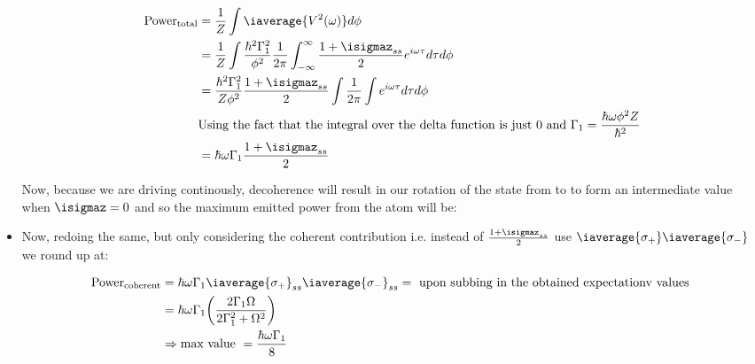 \begin{itemize}
 	\begin{equation}\label{feb220183}
 \begin{aligned}
 		\text{Power}_\text{total} &= \frac{1}{Z}\int 	\iaverage{V^2(\omega)}  d\phi\\
 		& = \frac{1}{Z}\int \frac{\hbar^2\Gamma_1^{2}}{\phi^2}\frac{1}{2\pi}\int_{-\infty}^{\infty} \frac{1+{\isigmaz}_{ss}}{2} e^{i\omega \tau}d\tau   d\phi\\
 		& = \frac{\hbar^2\Gamma_1^2}{Z\phi^2} \frac{1+{\isigmaz}_{ss}}{2} \int\frac{1}{2\pi}\int e^{i\omega\tau}d\tau d\phi\\
 		& \text{Using the fact that the integral over the delta function is just 0 and } \Gamma_1 = \frac{\hbar\omega\phi^2Z}{\hbar^2}\\
 		& = \hbar\omega\Gamma_1  \frac{1+{\isigmaz}_{ss}}{2}
 \end{aligned}
 	\end{equation}
 	
 	\noindent Now, because we are driving continously, decoherence will result in our rotation of the state from  to  to form an intermediate value when $ \isigmaz = 0 $ and so the maximum emitted power from the atom will be:
 	

	
	\item Now, redoing the same, but only considering the coherent contribution i.e. instead of $  \frac{1+{\isigmaz}_{ss}}{2} $ use $ \iaverage{\sigma_{+}}\iaverage{\sigma_{-}} $ we round up at:
	
	\begin{equation}\label{maximalCoherentEmission}
		 		\begin{aligned}
			 		\text{Power}_\text{coherent} &= \hbar\omega\Gamma_1 \iaverage{\sigma_{+}}_{ss} \iaverage{\sigma_{-}}_{ss} = \text{ upon subbing in the obtained expectationv values }\\
			 		& = \hbar\omega\Gamma_1\bigg(\frac{2\Gamma_1\Omega}{2\Gamma_1^2+\Omega^2}\bigg)\\&\Rightarrow \text{max value } = \frac{\hbar\omega\Gamma_1}{8}
		 		\end{aligned}
	\end{equation}
	
	 \end{itemize}
	\newpage

\newpage
